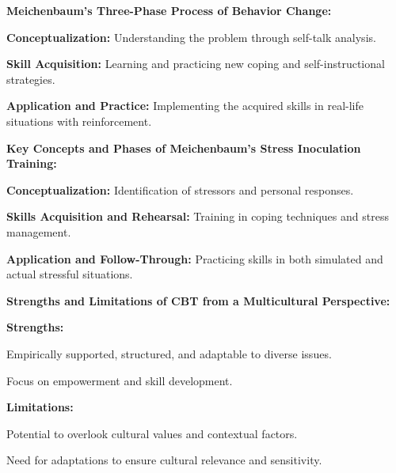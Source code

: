 \begin{coloredlist}
    \item \textbf{Meichenbaum’s Three-Phase Process of Behavior Change:}
    \begin{coloredlist}
        \item \textbf{Conceptualization:} Understanding the problem through self-talk analysis.
        \item \textbf{Skill Acquisition:} Learning and practicing new coping and self-instructional strategies.
        \item \textbf{Application and Practice:} Implementing the acquired skills in real-life situations with reinforcement.
    \end{coloredlist}

    \item \textbf{Key Concepts and Phases of Meichenbaum’s Stress Inoculation Training:}
    \begin{coloredlist}
        \item \textbf{Conceptualization:} Identification of stressors and personal responses.
        \item \textbf{Skills Acquisition and Rehearsal:} Training in coping techniques and stress management.
        \item \textbf{Application and Follow-Through:} Practicing skills in both simulated and actual stressful situations.
    \end{coloredlist}

    \item \textbf{Strengths and Limitations of CBT from a Multicultural Perspective:}
    \begin{coloredlist}
        \item \textbf{Strengths:}
        \begin{coloredlist}
            \item Empirically supported, structured, and adaptable to diverse issues.
            \item Focus on empowerment and skill development.
        \end{coloredlist}
        \item \textbf{Limitations:}
        \begin{coloredlist}
            \item Potential to overlook cultural values and contextual factors.
            \item Need for adaptations to ensure cultural relevance and sensitivity.
        \end{coloredlist}
    \end{coloredlist}


\end{coloredlist}
